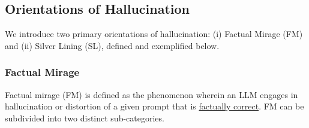 
\vspace{-3mm}
\subsection{Orientations of Hallucination}
We introduce two primary orientations of hallucination: (i) Factual Mirage (FM) and (ii) Silver Lining (SL), defined and exemplified below.

\vspace{-1mm}
\subsubsection{Factual Mirage} 
Factual mirage (FM) is defined as the phenomenon wherein an LLM engages in hallucination or distortion of a  given prompt that is \ul{factually correct}. FM can be subdivided into two distinct sub-categories.

